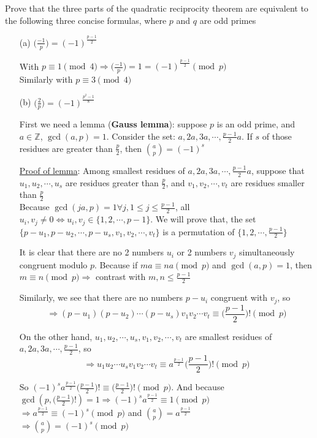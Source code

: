 \begin{exer}[3.38] Prove that the three parts of the quadratic reciprocity theorem are equivalent to the following three concise formulas, where $p$ and $q$ are odd primes
	\begin{enumerate}
		\item [(a)] $\Big(\frac{-1}{p}\Big) = (-1)^{\frac{p-1}{2}}$
		
		With $p \equiv 1 \pmod 4 \Rightarrow \Big(\frac{-1}{p}\Big) = 1 = (-1)^{\frac{p-1}{2}} \pmod p$ \\ Similarly with $p \equiv 3 \pmod 4$
		\item [(b)] $\Big(\frac{2}{p}\Big) = (-1)^{\frac{p^2-1}{8}}$
		
		First we need a lemma (\textbf{Gauss lemma}): suppose $p$ is an odd prime, and $a \in \mathbb{Z}$, $\gcd(a, p) = 1$. Consider the set: $a, 2a, 3a, \cdots, \frac{p-1}{2}a$. If $s$ of those residues are greater than $\frac{p}{2}$, then $\binom{a}{p} = (-1)^s$
		
		\underline{Proof of lemma}: Among smallest residues of $a, 2a, 3a, \cdots, \frac{p-1}{2}a$, suppose that $u_1, u_2, \cdots, u_s$ are residues greater than $\frac{p}{2}$, and $v_1, v_2, \cdots, v_t$ are residues smaller than $\frac{p}{2}$ \\ Because $\gcd(ja, p)=1 \forall j, 1 \leq j \leq \frac{p-1}{2}$, all $u_i, v_j \neq 0 \Leftrightarrow u_i, v_j \in \{1,2,\cdots,p-1\}$. We will prove that, the set $\{p-u_1, p-u_2, \cdots, p-u_s, v_1, v_2, \cdots, v_t\}$ is a permutation of $\{1,2,\cdots,\frac{p-1}{2}\}$
		
		It is clear that there are no 2 numbers $u_i$ or 2 numbers $v_j$ simultaneously congruent modulo $p$. Because if $ma \equiv na \pmod p$ and $\gcd(a,p)=1$, then $m\equiv n \pmod p \Rightarrow$ contrast with $m,n \leq \frac{p-1}{2}$
		
		Similarly, we see that there are no numbers $p-u_i$ congruent with $v_j$, so $$\Rightarrow (p-u_1)(p-u_2)\cdots(p-u_s)v_1 v_2 \cdots v_t \equiv \Big(\frac{p-1}{2}\Big)! \pmod p$$
		
		On the other hand, $u_1,u_2,\cdots,u_s, v_1, v_2, \cdots, v_t$ are smallest residues of $a, 2a, 3a, \cdots, \frac{p-1}{2}$, so $$\Rightarrow u_1 u_2 \cdots u_s v_1 v_2 \cdots v_t \equiv a^{\frac{p-1}{2}} \Big(\frac{p-1}{2}\Big)! \pmod p$$
		
		So $(-1)^s a^{\frac{p-1}{2}} \Big(\frac{p-1}{2}\Big)! \equiv \Big(\frac{p-1}{2}\Big)! \pmod p$. And because $\gcd(p, \Big(\frac{p-1}{2}\Big)!) = 1 \Rightarrow (-1)^s a^{\frac{p-1}{2}} \equiv 1 \pmod p$ \\ $\Rightarrow a^{\frac{p-1}{2}} \equiv (-1)^s \pmod p$ and $\binom{a}{p} = a^{\frac{p-1}{2}}$ \\ $\Rightarrow \binom{a}{p} = (-1)^s \pmod p$
		

\end{enumerate}
\end{exer}

